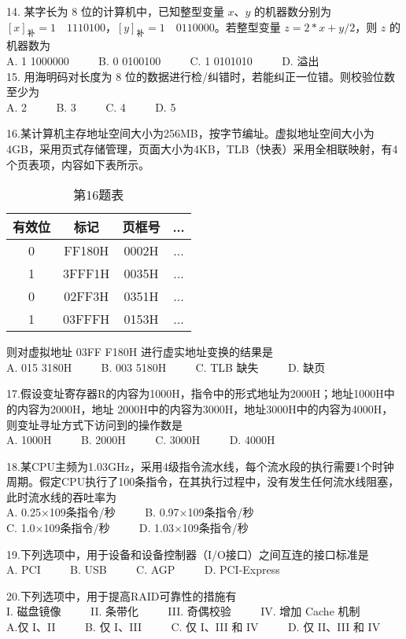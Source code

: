 14.	某字长为 $8$ 位的计算机中，已知整型变量 $x$、$y$ 的机器数分别为 $[x]_\text{补}=1 \quad 1110100$，$[y]_\text{补}=1 \quad 0110000$。若整型变量 $z=2*x+y/2$，则 $z$ 的机器数为 \\
A. 1 1000000 $\qquad$ B. 0 0100100  $\qquad$  C. 1 0101010  $\qquad$  D. 溢出 \\

15.	用海明码对长度为 $8$ 位的数据进行检/纠错时，若能纠正一位错。则校验位数至少为 \\ 
A. 2 $\qquad$ B. 3 $\qquad$ C. 4 $\qquad$ D. 5 

16.某计算机主存地址空间大小为256MB，按字节编址。虚拟地址空间大小为4GB，采用页式存储管理，页面大小为4KB，TLB（快表）采用全相联映射，有4个页表项，内容如下表所示。
\begin{table}[ht]
\centering
\caption{第16题表}\label{tab_CSN13_2}
\begin{tabular}{|c|c|c|c|}
\hline
有效位 & 标记 & 页框号 & ... \\
\hline
0 & FF180H & 0002H & ... \\
\hline
1 & 3FFF1H & 0035H & ... \\
\hline
0 & 02FF3H & 0351H & ... \\
\hline
1 & 03FFFH & 0153H & ... \\
\hline
\end{tabular}
\end{table}
则对虚拟地址 03FF F180H 进行虚实地址变换的结果是 \\ 
A. 015 3180H $\qquad$ B. 003 5180H $\qquad$ C. TLB 缺失 $\qquad$ D. 缺页

17.假设变址寄存器R的内容为1000H，指令中的形式地址为2000H；地址1000H中的内容为2000H，地址 2000H中的内容为3000H，地址3000H中的内容为4000H，则变址寻址方式下访问到的操作数是 \\
A. 1000H $\qquad$ B. 2000H $\qquad$ C. 3000H $\qquad$ D. 4000H

18.某CPU主频为1.03GHz，采用4级指令流水线，每个流水段的执行需要1个时钟周期。假定CPU执行了100条指令，在其执行过程中，没有发生任何流水线阻塞，此时流水线的吞吐率为 \\
A. 0.25×109条指令/秒 $\qquad$ B. 0.97×109条指令/秒 \\
C. 1.0×109条指令/秒  $\qquad$ D. 1.03×109条指令/秒

19.下列选项中，用于设备和设备控制器（I/O接口）之间互连的接口标准是 \\
A. PCI  $\qquad$  B. USB  $\qquad$ C. AGP  $\qquad$  D. PCI-Express

20.下列选项中，用于提高RAID可靠性的措施有 \\
I. 磁盘镜像 $\qquad$ II. 条带化 $\qquad$ III. 奇偶校验 $\qquad$ IV. 增加 Cache 机制 \\
A.仅 I、II  $\qquad$  B. 仅 I、III  $\qquad$  C. 仅 I、III 和 IV $\qquad$ D. 仅 II、III 和 IV

